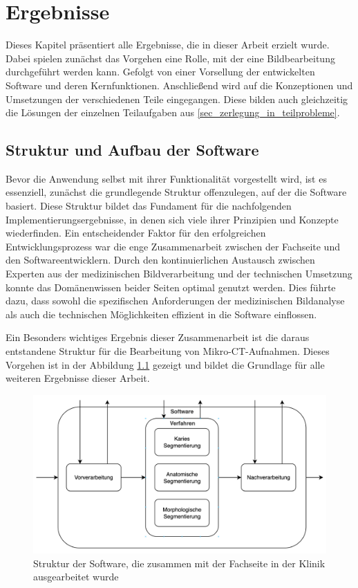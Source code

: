 \chapter{Ergebnisse}
\label{chap:ergebnisse} Dieses Kapitel präsentiert alle Ergebnisse, die in
dieser Arbeit erzielt wurde. Dabei spielen zunächst das Vorgehen eine Rolle, mit
der eine Bildbearbeitung durchgeführt werden kann. Gefolgt von einer Vorsellung der
entwickelten Software und deren Kernfunktionen. Anschließend wird auf die
Konzeptionen und Umsetzungen der verschiedenen Teile eingegangen. Diese bilden auch
gleichzeitig die Lösungen der einzelnen Teilaufgaben aus \ref{sec_zerlegung_in_teilprobleme}.

\section{Struktur und Aufbau der Software}
\label{sec:struktur_der_software} Bevor die Anwendung selbst mit ihrer Funktionalität
vorgestellt wird, ist es essenziell, zunächst die grundlegende Struktur offenzulegen,
auf der die Software basiert. Diese Struktur bildet das Fundament für die nachfolgenden
Implementierungsergebnisse, in denen sich viele ihrer Prinzipien und Konzepte
wiederfinden. Ein entscheidender Faktor für den erfolgreichen Entwicklungsprozess
war die enge Zusammenarbeit zwischen der Fachseite und den Softwareentwicklern.
Durch den kontinuierlichen Austausch zwischen Experten aus der medizinischen
Bildverarbeitung und der technischen Umsetzung konnte das Domänenwissen beider
Seiten optimal genutzt werden. Dies führte dazu, dass sowohl die spezifischen
Anforderungen der medizinischen Bildanalyse als auch die technischen
Möglichkeiten effizient in die Software einflossen.

Ein Besonders wichtiges Ergebnis dieser Zusammenarbeit ist die daraus
entstandene Struktur für die Bearbeitung von Mikro-CT-Aufnahmen. Dieses Vorgehen
ist in der Abbildung \ref{fig:struktur_der_software} gezeigt und bildet die Grundlage
für alle weiteren Ergebnisse dieser Arbeit.

\begin{figure}[h]
	\centering
	\includegraphics[width=1\textwidth]{img/struktur_der_software.png}
	\caption{Struktur der Software, die zusammen mit der Fachseite in der Klinik ausgearbeitet
	wurde}
	\label{fig:struktur_der_software}
\end{figure}

